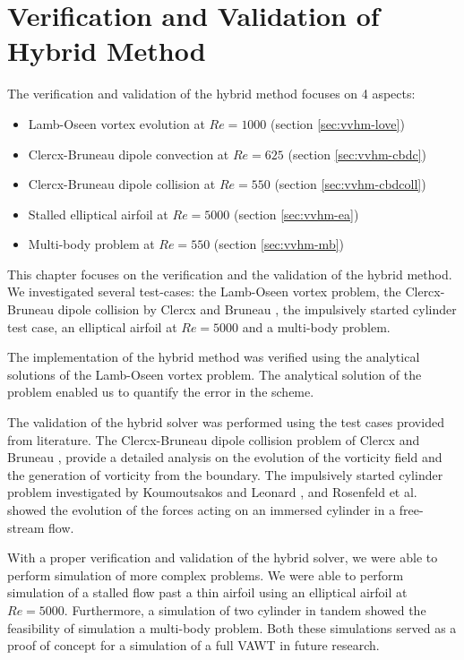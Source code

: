 \chapter{Verification and Validation of Hybrid Method}
\label{ch:vavohm}

The verification and validation of the hybrid method focuses on 4 aspects:
\begin{itemize}
\item Lamb-Oseen vortex evolution at $Re=1000$ (section \ref{sec:vvhm-love})
\item Clercx-Bruneau dipole convection at $Re=625$ (section \ref{sec:vvhm-cbdc})
\item Clercx-Bruneau dipole collision at $Re=550$ (section \ref{sec:vvhm-cbdcoll})
\item Stalled elliptical airfoil at $Re=5000$ (section \ref{sec:vvhm-ea})
\item Multi-body problem at $Re=550$ (section \ref{sec:vvhm-mb})
\end{itemize}

This chapter focuses on the verification and the validation of the hybrid method. We investigated several test-cases: the Lamb-Oseen vortex problem, the Clercx-Bruneau dipole collision by Clercx and Bruneau \cite{Clercx2006a}, the impulsively started cylinder test case, an elliptical airfoil at $Re=5000$ and a multi-body problem.

The implementation of the hybrid method was verified using the analytical solutions of the Lamb-Oseen vortex problem. The analytical solution of the problem enabled us to quantify the error in the scheme.

The validation of the hybrid solver was performed using the test cases provided from literature. The Clercx-Bruneau dipole collision problem of Clercx and Bruneau \cite{Clercx2006a}, provide a detailed analysis on the evolution of the vorticity field and the generation of vorticity from the boundary. The impulsively started cylinder problem investigated by Koumoutsakos and Leonard \cite{Koumoutsakos1995a}, and Rosenfeld et al. \cite{MosheRosenFeldDochanKwak1991} showed the evolution of the forces acting on an immersed cylinder in a free-stream flow.

With a proper verification and validation of the hybrid solver, we were able to perform simulation of more complex problems. We were able to perform simulation of a stalled flow past a thin airfoil using an elliptical airfoil at $Re=5000$. Furthermore, a simulation of two cylinder in tandem showed the feasibility of simulation a multi-body problem. Both these simulations served as a proof of concept for a simulation of a full VAWT in future research.

